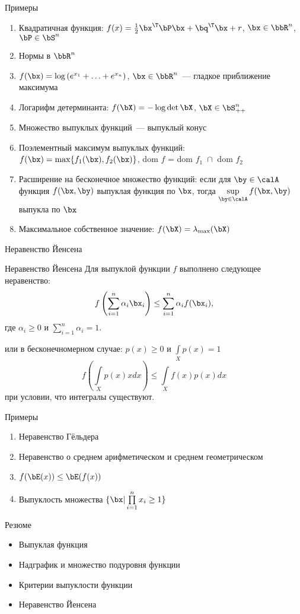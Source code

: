\documentclass[12pt]{beamer}
\begin{document}
\begin{frame}{Примеры}
\begin{enumerate}[<+->]
\item Квадратичная функция: $f(x) = \frac{1}{2}\bx^{\T}\bP\bx + \bq^{\T}\bx + r$, $\bx \in \bbR^n$, $\bP \in \bS^n$
\item Нормы в $\bbR^n$
\item $f(\bx) = \log{(e^{x_1} + \ldots + e^{x_n})}$, $\bx \in \bbR^n$~--- гладкое приближение максимума
\item Логарифм детерминанта: $f(\bX) = -\log{\det{\bX}}$, $\bX \in \bS^n_{++}$
\item Множество выпуклых функций~--- выпуклый конус
\item Поэлементный максимум выпуклых функций: $f(\bx) = \max\{f_1(\bx), f_2(\bx)\}$, dom $f$ = dom $f_1 \; \cap $ dom $f_2$
\item Расширение на бесконечное множество функций: если для $\by \in \calA$ функция $f(\bx, \by)$ выпуклая функция по $\bx$, тогда $\sup\limits_{\by \in \calA} f(\bx, \by) $ выпукла по $\bx$
\item Максимальное собственное значение: $f(\bX) = \lambda_{\max}(\bX)$ 

\end{enumerate}
\end{frame}

\begin{frame}{Неравенство Йенсена}
 
\begin{block}{Неравенство Йенсена}
Для выпуклой функции $f$ выполнено следующее неравенство:
\vspace{-4mm}
\[
f\left( \sum\limits_{i=1}^n \alpha_i \bx_i \right) \leq \sum\limits_{i=1}^n \alpha_i f(\bx_i),
\vspace{-4mm}
\] 
где $\alpha_i \geq 0$ и $\sum\limits_{i=1}^n \alpha_i = 1$.
\end{block}

или в бесконечномерном случае: $p(x) \geq 0$ и $\int\limits_X p(x) = 1$ 
\vspace{-4mm}
\[
f\left( \int\limits_X p(x)xdx \right) \leq \int\limits_X f(x)p(x)dx
\]
при условии, что интегралы существуют.

\end{frame}

\begin{frame}{Примеры}
\begin{enumerate}
\item Неравенство Гёльдера
\item Неравенство о среднем арифметическом и среднем геометрическом
\item $f(\bE(x)) \leq \bE(f(x))$
\item Выпуклость множества $\{ \bx | \prod\limits_{i=1}^n x_i \geq 1 \}$
\end{enumerate}
\end{frame}

\begin{frame}{Резюме}
\begin{itemize}
\item Выпуклая функция
\item Надграфик и множество подуровня функции
\item Критерии выпуклости функции
\item Неравенство Йенсена
\end{itemize}
\end{frame}
\end{document}
